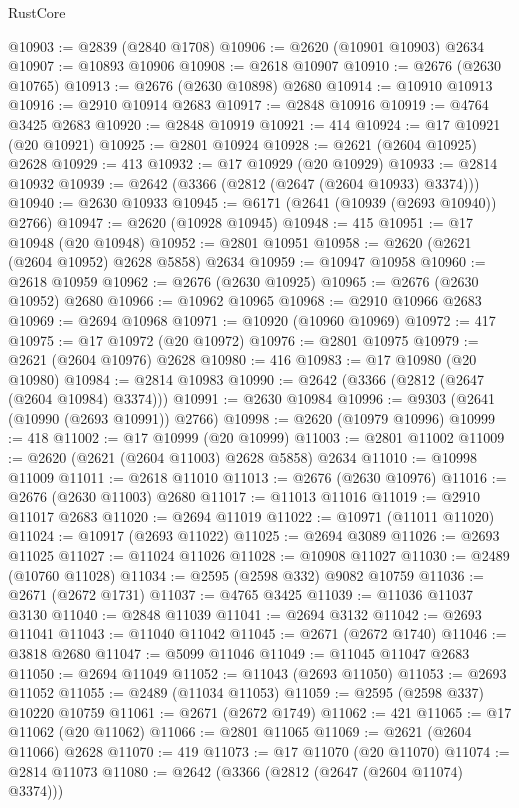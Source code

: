 \begin{lexlean}{RustCore}
\begin{coremodule}
@10903 := @2839 (@2840 @1708)
@10906 := @2620 (@10901 @10903) @2634
@10907 := @10893 @10906
@10908 := @2618 @10907
@10910 := @2676 (@2630 @10765)
@10913 := @2676 (@2630 @10898) @2680
@10914 := @10910 @10913
@10916 := @2910 @10914 @2683
@10917 := @2848 @10916
@10919 := @4764 @3425 @2683
@10920 := @2848 @10919
@10921 := 414
@10924 := @17 @10921 (@20 @10921)
@10925 := @2801 @10924
@10928 := @2621 (@2604 @10925) @2628
@10929 := 413
@10932 := @17 @10929 (@20 @10929)
@10933 := @2814 @10932
@10939 := @2642 (@3366 (@2812 (@2647 (@2604 @10933) @3374)))
@10940 := @2630 @10933
@10945 := @6171 (@2641 (@10939 (@2693 @10940)) @2766)
@10947 := @2620 (@10928 @10945)
@10948 := 415
@10951 := @17 @10948 (@20 @10948)
@10952 := @2801 @10951
@10958 := @2620 (@2621 (@2604 @10952) @2628 @5858) @2634
@10959 := @10947 @10958
@10960 := @2618 @10959
@10962 := @2676 (@2630 @10925)
@10965 := @2676 (@2630 @10952) @2680
@10966 := @10962 @10965
@10968 := @2910 @10966 @2683
@10969 := @2694 @10968
@10971 := @10920 (@10960 @10969)
@10972 := 417
@10975 := @17 @10972 (@20 @10972)
@10976 := @2801 @10975
@10979 := @2621 (@2604 @10976) @2628
@10980 := 416
@10983 := @17 @10980 (@20 @10980)
@10984 := @2814 @10983
@10990 := @2642 (@3366 (@2812 (@2647 (@2604 @10984) @3374)))
@10991 := @2630 @10984
@10996 := @9303 (@2641 (@10990 (@2693 @10991)) @2766)
@10998 := @2620 (@10979 @10996)
@10999 := 418
@11002 := @17 @10999 (@20 @10999)
@11003 := @2801 @11002
@11009 := @2620 (@2621 (@2604 @11003) @2628 @5858) @2634
@11010 := @10998 @11009
@11011 := @2618 @11010
@11013 := @2676 (@2630 @10976)
@11016 := @2676 (@2630 @11003) @2680
@11017 := @11013 @11016
@11019 := @2910 @11017 @2683
@11020 := @2694 @11019
@11022 := @10971 (@11011 @11020)
@11024 := @10917 (@2693 @11022)
@11025 := @2694 @3089
@11026 := @2693 @11025
@11027 := @11024 @11026
@11028 := @10908 @11027
@11030 := @2489 (@10760 @11028)
@11034 := @2595 (@2598 @332) @9082 @10759
@11036 := @2671 (@2672 @1731)
@11037 := @4765 @3425
@11039 := @11036 @11037 @3130
@11040 := @2848 @11039
@11041 := @2694 @3132
@11042 := @2693 @11041
@11043 := @11040 @11042
@11045 := @2671 (@2672 @1740)
@11046 := @3818 @2680
@11047 := @5099 @11046
@11049 := @11045 @11047 @2683
@11050 := @2694 @11049
@11052 := @11043 (@2693 @11050)
@11053 := @2693 @11052
@11055 := @2489 (@11034 @11053)
@11059 := @2595 (@2598 @337) @10220 @10759
@11061 := @2671 (@2672 @1749)
@11062 := 421
@11065 := @17 @11062 (@20 @11062)
@11066 := @2801 @11065
@11069 := @2621 (@2604 @11066) @2628
@11070 := 419
@11073 := @17 @11070 (@20 @11070)
@11074 := @2814 @11073
@11080 := @2642 (@3366 (@2812 (@2647 (@2604 @11074) @3374)))

\end{coremodule}
\end{lexlean}
